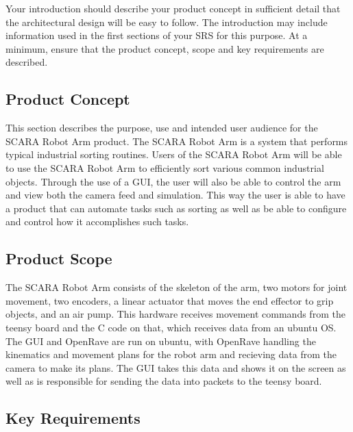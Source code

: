 

Your introduction should describe your product concept in sufficient detail that the architectural design will be easy to follow. The introduction may include information used in the first sections of your SRS for this purpose. At a minimum, ensure that the product concept, scope and key requirements are described.

\subsection{Product Concept}
This section describes the purpose, use and intended user audience for the SCARA Robot Arm product.
The SCARA Robot Arm is a system that performs typical industrial sorting routines. Users of the SCARA
Robot Arm will be able to use the SCARA Robot Arm to efficiently sort various common industrial objects. Through the use of a GUI, the user will also be able to control the arm and view both the camera feed and simulation. This way the user is able to have a product that can automate tasks such as sorting as well as be able to configure and control how it accomplishes such tasks.

\subsection{Product Scope}

The SCARA Robot Arm consists of the skeleton of the arm, two motors for joint movement, two encoders, a linear actuator that moves the end effector to grip objects, and an air pump. This hardware receives movement commands from the teensy board and the C code on that, which receives data from an ubuntu OS. The GUI and OpenRave are run on ubuntu, with OpenRave handling the kinematics and movement plans for the robot arm and recieving data from the camera to make its plans. The GUI takes this data and shows it on the screen as well as is responsible for sending the data into packets to the teensy board. 



\subsection{Key Requirements}
 
\setlength{\arrayrulewidth}{1mm}
\setlength{\tabcolsep}{18pt}
\renewcommand{\arraystretch}{2.5}

